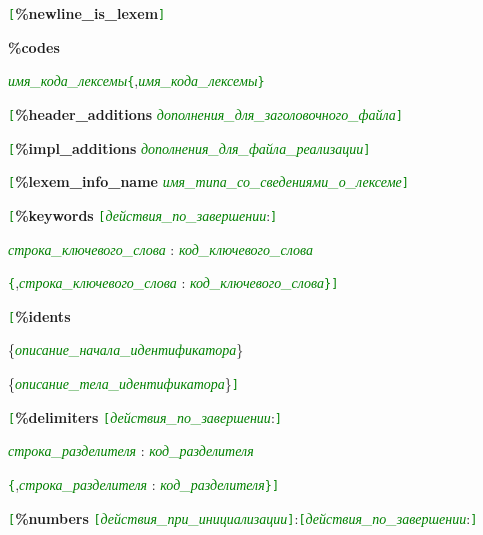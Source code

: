 \documentclass[10pt]{report}
\begin{document}
\noindent%
\texttt{\textcolor{Green}{[}}\textbf{\%newline_is_lexem}\texttt{\textcolor{Green}{]}} 

\noindent%
\textbf{\%codes}

\textcolor{Green}{\textit{имя_кода_лексемы}}\texttt{\textcolor{Green}{\{}},\textcolor{Green}{\textit{имя_кода_лексемы}}\texttt{\textcolor{Green}{\}}}

\noindent%
\texttt{\textcolor{Green}{[}}\textbf{\%header_additions}  \textcolor{Green}{\textit{дополнения_для_заголовочного_файла}}\texttt{\textcolor{Green}{]}}

\noindent%
\texttt{\textcolor{Green}{[}}\textbf{\%impl_additions}  \textcolor{Green}{\textit{дополнения_для_файла_реализации}}\texttt{\textcolor{Green}{]}}

\noindent%
\texttt{\textcolor{Green}{[}}\textbf{\%lexem_info_name}  \textcolor{Green}{\textit{имя_типа_со_сведениями_о_лексеме}}\texttt{\textcolor{Green}{]}}

\noindent%
\texttt{\textcolor{Green}{[}}\textbf{\%keywords} \texttt{\textcolor{Green}{[}}\textcolor{Green}{\textit{действия_по_завершении}}:\texttt{\textcolor{Green}{]}}

\textcolor{Green}{\textit{строка_ключевого_слова}} : \textcolor{Green}{\textit{код_ключевого_слова}}

\texttt{\textcolor{Green}{\{}},\textcolor{Green}{\textit{строка_ключевого_слова}} : \textcolor{Green}{\textit{код_ключевого_слова}}\texttt{\textcolor{Green}{\}}}\texttt{\textcolor{Green}{]}}

\noindent%
\texttt{\textcolor{Green}{[}}\textbf{\%idents}

\{\textcolor{Green}{\textit{описание_начала_идентификатора}}\}

\{\textcolor{Green}{\textit{описание_тела_идентификатора}}\}\texttt{\textcolor{Green}{]}}

\noindent%
\texttt{\textcolor{Green}{[}}\textbf{\%delimiters} \texttt{\textcolor{Green}{[}}\textcolor{Green}{\textit{действия_по_завершении}}:\texttt{\textcolor{Green}{]}}

\textcolor{Green}{\textit{строка_разделителя}} : \textcolor{Green}{\textit{код_разделителя}}

\texttt{\textcolor{Green}{\{}},\textcolor{Green}{\textit{строка_разделителя}} : \textcolor{Green}{\textit{код_разделителя}}\texttt{\textcolor{Green}{\}}}\texttt{\textcolor{Green}{]}}

\noindent%
\texttt{\textcolor{Green}{[}}\textbf{\%numbers} \texttt{\textcolor{Green}{[}}\textcolor{Green}{\textit{действия_при_инициализации}}\texttt{\textcolor{Green}{]}}:\texttt{\textcolor{Green}{[}}\textcolor{Green}{\textit{действия_по_завершении}}:\texttt{\textcolor{Green}{]}} 
\end{document}
